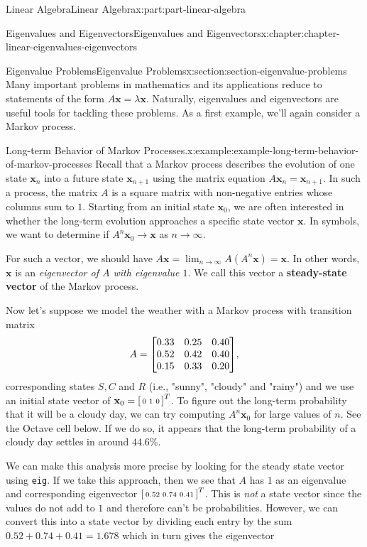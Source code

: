 \documentclass[twoside,10pt,]{book}
\newcommand{\mono}[1]{\texttt{#1}}
\newcommand{\terminology}[1]{\textbf{#1}}
\numberwithin{equation}{part}
\providecommand{\vb}[1]{\mathbf{#1}}
\begin{document}
\begin{partptx}{Linear Algebra}{}{Linear Algebra}{}{}{x:part:part-linear-algebra}
\begin{chapterptx}{Eigenvalues and Eigenvectors}{}{Eigenvalues and Eigenvectors}{}{}{x:chapter:chapter-linear-eigenvalues-eigenvectors}
\typeout{************************************************}
%
\begin{sectionptx}{Eigenvalue Problems}{}{Eigenvalue Problems}{}{}{x:section:section-eigenvalue-problems}
Many important problems in mathematics and its applications reduce to statements of the form \(A\vb{x} = \lambda\vb{x}\). Naturally, eigenvalues and eigenvectors are useful tools for tackling these problems. As a first example, we'll again consider a Markov process.%
\begin{example}{Long-term Behavior of Markov Processes.}{x:example:example-long-term-behavior-of-markov-processes}%
Recall that a Markov process describes the evolution of one state \(\vb{x}_{n}\) into a future state \(\vb{x}_{n+1}\) using the matrix equation \(A\vb{x}_n = \vb{x}_{n+1}\). In such a process, the matrix \(A\) is a square matrix with non-negative entries whose columns sum to \(1\). Starting from an initial state \(\vb{x}_0\), we are often interested in whether the long-term evolution approaches a specific state vector \(\vb{x}\). In symbols, we want to determine if \(A^n\vb{x}_0 \to \vb{x}\) as \(n\to\infty\).%
\par
For such a vector, we should have \(A\vb{x} = \lim_{n\to\infty}A(A^n\vb{x}) = \vb{x}\). In other words, \(\vb{x}\) is an \emph{eigenvector of \(A\) with eigenvalue \(1\)}. We call this vector a \terminology{steady-state vector} of the Markov process.%
\par
Now let's suppose we model the weather with a Markov process with transition matrix%
\begin{equation*}
A = \mqty[0.33 & 0.25 & 0.40 \\ 0.52 & 0.42 & 0.40 \\ 0.15 & 0.33 & 0.20],
\end{equation*}
corresponding states \(S, C\) and \(R\) (i.e., "sunny", "cloudy" and "rainy") and we use an initial state vector of \(\vb{x}_0 = \smqty[0 & 1 & 0]^T\). To figure out the long-term probability that it will be a cloudy day, we can try computing \(A^n\vb{x}_0\) for large values of \(n\). See the Octave cell below. If we do so, it appears that the long-term probability of a cloudy day settles in around \(44.6\%\).%
\par
We can make this analysis more precise by looking for the steady state vector using \mono{eig}. If we take this approach, then we see that \(A\) has \(1\) as an eigenvalue and corresponding eigenvector \(\smqty[0.52 & 0.74 & 0.41]^{T}\). This is \emph{not} a state vector since the values do not add to \(1\) and therefore can't be probabilities. However, we can convert this into a state vector by dividing each entry by the sum \(0.52+0.74+0.41 = 1.678\) which in turn gives the eigenvector%

\end{example}
\end{sectionptx}
\end{chapterptx}
\end{partptx}
\end{document}
